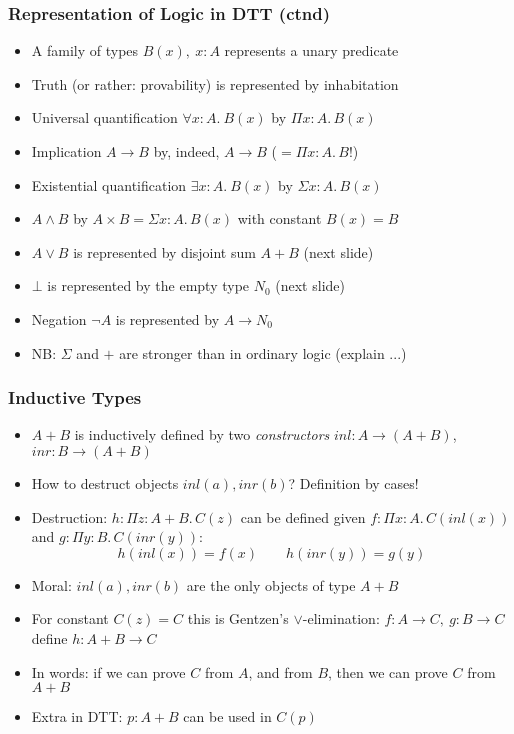 \documentclass[handout]{beamer}
\newcommand{\depi}[3]{\Pi{#1{:}#2.\,#3}}
\newcommand{\sigm}[3]{\Sigma{#1{:}#2.\,#3}}
\begin{document}
 \frame
  {
  
    \frametitle{Representation of Logic in DTT (ctnd)}

    \begin{itemize}[<+->]
    \item A family of types $B(x),~x:A$ represents a unary predicate
    \item Truth (or rather: provability) is represented by inhabitation
    \item Universal quantification $\forall x{:}A.~B(x)$ by $\depi{x}{A}{B(x)}$
    \item Implication $A\to B$ by, indeed, $A\to B$ (${}=\depi{x}{A}{B}$!)  
    \item Existential quantification $\exists x{:}A.~B(x)$ by $\sigm{x}{A}{B(x)}$
    \item $A\land B$ by $A\times B = \sigm{x}{A}{B(x)}$ with constant $B(x)=B$
    \item $A\lor B$ is represented by disjoint sum $A+B$ (next slide)
    \item $\bot$ is represented by the empty type $N_0$ (next slide)
    \item Negation $\neg A$ is represented by $A\to N_0$
    \item NB: $\Sigma$ and $+$ are stronger than in ordinary logic (explain ...)
    \end{itemize}
  }

\frame
  {
  
    \frametitle{Inductive Types}

    \begin{itemize}[<+->]
    \item $A+B$ is inductively defined by 
    two \emph{constructors} $inl:  A \to (A+B)$,  $inr:  B \to (A+B)$
    \item How to destruct objects $inl(a), inr(b)$? Definition by cases!
    \item Destruction: $h: \depi{z}{A+B}{C(z)}$ can be defined
    given $f: \depi{x}{A}{C(inl(x))}$ and $g: \depi{y}{B}{C(inr(y))}$:
     \[h(inl(x)) = f(x) \quad\quad  h(inr(y)) = g(y)\]
    \item Moral: $inl(a), inr(b)$ are the only objects of type $A+B$
    \item For constant $C(z)=C$ this is Gentzen's $\lor$-elimination:
    $f: A \to C,~g: B \to C$ define $h: A+B \to C$
   \item In words: if we can prove $C$ from $A$,
   and from $B$, then we can prove $C$ from $A+B$
   \item Extra in DTT: $p: A+B$ can be used in $C(p)$    
    \end{itemize}
  }
\end{document}
